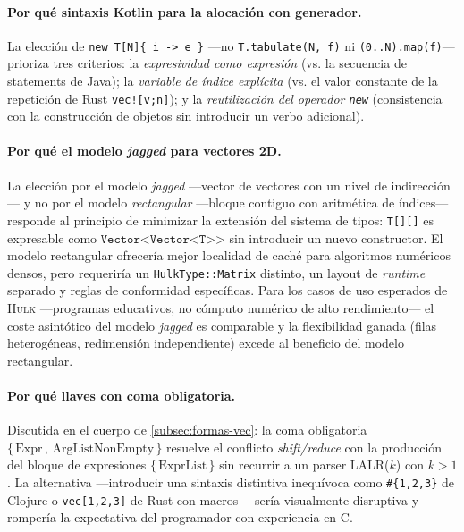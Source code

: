 \documentclass[11pt,a4paper,oneside,openany]{report}
\newcommand{\hulk}{\textsc{Hulk}}
\newcommand{\code}[1]{\texttt{#1}}
\begin{document}
\paragraph{Por qué sintaxis Kotlin para la alocación con generador.}
La elección de \code{new T[N]\{ i -> e \}} ---no \code{T.tabulate(N, f)}
ni \code{(0..N).map(f)}--- prioriza tres criterios: la \emph{expresividad
como expresión} (vs. la secuencia de statements de Java); la
\emph{variable de índice explícita} (vs. el valor constante de la
repetición de Rust \code{vec![v;n]}); y la \emph{reutilización del
operador \code{new}} (consistencia con la construcción de objetos sin
introducir un verbo adicional).

\paragraph{Por qué el modelo \emph{jagged} para vectores 2D.}
La elección por el modelo \emph{jagged} ---vector de vectores con un
nivel de indirección--- y no por el modelo \emph{rectangular} ---bloque
contiguo con aritmética de índices--- responde al principio de minimizar
la extensión del sistema de tipos: \code{T[][]} es expresable como
$\code{Vector<Vector<T>>}$ sin introducir un nuevo constructor. El modelo
rectangular ofrecería mejor localidad de caché para algoritmos numéricos
densos, pero requeriría un \code{HulkType::Matrix} distinto, un layout de
\textit{runtime} separado y reglas de conformidad específicas. Para los
casos de uso esperados de \hulk{} ---programas educativos, no cómputo
numérico de alto rendimiento--- el coste asintótico del modelo
\emph{jagged} es comparable y la flexibilidad ganada (filas heterogéneas,
redimensión independiente) excede al beneficio del modelo rectangular.

\paragraph{Por qué llaves con coma obligatoria.}
Discutida en el cuerpo de \cref{subsec:formas-vec}: la coma obligatoria
$\{\,\text{Expr}\,,\,\text{ArgListNonEmpty}\,\}$ resuelve el conflicto
\emph{shift/reduce} con la producción del bloque de expresiones
$\{\,\text{ExprList}\,\}$ sin recurrir a un parser LALR($k$) con $k > 1$.
La alternativa ---introducir una sintaxis distintiva inequívoca como
\code{\#\{1,2,3\}} de Clojure o \code{vec[1,2,3]} de Rust con macros---
sería visualmente disruptiva y rompería la expectativa del programador
con experiencia en C.

\end{document}
